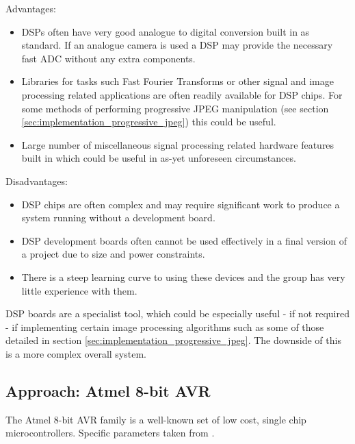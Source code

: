 
Advantages:
\begin{itemize}
\item DSPs often have very good analogue to digital conversion built in as standard. If an analogue camera is used a DSP may provide the necessary fast ADC without any extra components.

\item Libraries for tasks such Fast Fourier Transforms or other signal and image processing related applications are often readily available for DSP chips. For some methods of performing progressive JPEG manipulation (see section \ref{sec:implementation_progressive_jpeg}) this could be useful.

\item Large number of miscellaneous signal processing related hardware features built in which could be useful in as-yet unforeseen circumstances.
\end{itemize}

Disadvantages:
\begin{itemize}
\item DSP chips are often complex and may require significant work to produce a system running without a development board.

\item DSP development boards often cannot be used effectively in a final version of a project due to size and power constraints.

\item There is a steep learning curve to using these devices and the group has very little experience with them.
\end{itemize}


DSP boards are a specialist tool, which could be especially useful - if not required - if implementing certain image processing algorithms such as some of those detailed in section  \ref{sec:implementation_progressive_jpeg}. The downside of this is a more complex overall system.

\subsection{Approach: Atmel 8-bit AVR}
\label{sec:desappr:avr}
The Atmel 8-bit AVR family is a well-known set of low cost, single chip microcontrollers. Specific parameters taken from \cite{avr_param}.

